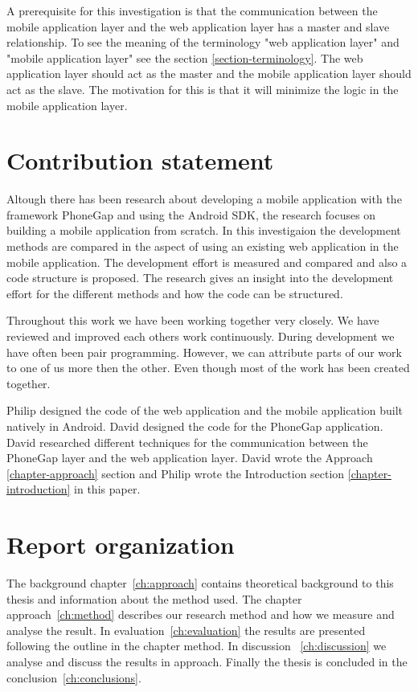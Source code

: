 A prerequisite for this investigation is that the communication between the mobile application layer and the web application layer has a master and slave relationship. To see the meaning of the terminology "web application layer" and "mobile application layer" see the section \ref{section-terminology}. The web application layer should act as the master and the mobile application layer should act as the slave. The motivation for this is that it will minimize the logic in the mobile application layer.

\section{Contribution statement}\label{sec:contribution-statement}
Altough there has been research about developing a mobile application with the framework PhoneGap and using the Android SDK, the research focuses on building a mobile application from scratch. In this investigaion the development methods are compared in the aspect of using an existing web application in the mobile application. The development effort is measured and compared and also a code structure is proposed. The research gives an insight into the development effort for the different methods and how the code can be structured.

Throughout this work we have been working together very closely. We have reviewed and improved each others work continuously. During development we have often been pair programming. However, we can attribute parts of our work to one of us more then the other. Even though most of the work has been created together.

Philip designed the code of the web application and the mobile application built natively in Android. David designed the code for the PhoneGap application. David researched different techniques for the communication between the PhoneGap layer and the web application layer. David wrote the Approach \ref{chapter-approach} section and Philip wrote the Introduction section \ref{chapter-introduction} in this paper.

\section{Report organization}\label{sec:report-organization}
The background chapter~\ref{ch:approach} contains theoretical background to this thesis and information about the method used. The chapter approach~\ref{ch:method} describes our research method and how we measure and analyse the result. In evaluation~\ref{ch:evaluation} the results are presented following the outline in the chapter method. In discussion ~\ref{ch:discussion} we analyse and discuss the results in approach. Finally the thesis is concluded in the conclusion~\ref{ch:conclusions}.